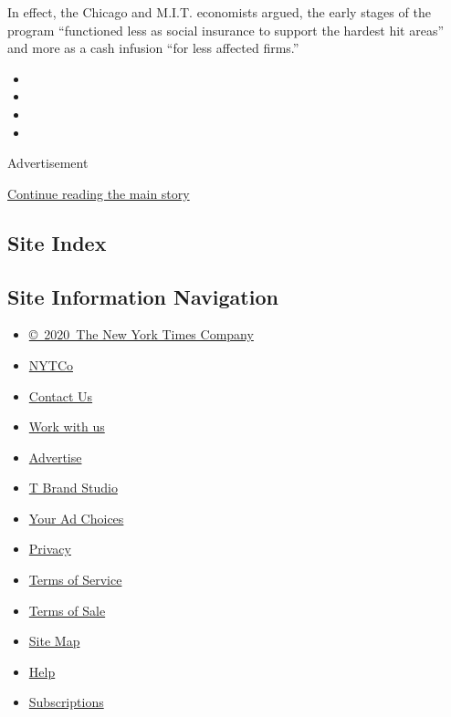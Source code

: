 In effect, the Chicago and M.I.T. economists argued, the early stages of
the program ``functioned less as social insurance to support the hardest
hit areas'' and more as a cash infusion ``for less affected firms.''

\begin{itemize}
\item
\item
\item
\item
\end{itemize}

Advertisement

\protect\hyperlink{after-bottom}{Continue reading the main story}

\hypertarget{site-index}{%
\subsection{Site Index}\label{site-index}}

\hypertarget{site-information-navigation}{%
\subsection{Site Information
Navigation}\label{site-information-navigation}}

\begin{itemize}
\tightlist
\item
  \href{https://help.nytimes3xbfgragh.onion/hc/en-us/articles/115014792127-Copyright-notice}{©~2020~The
  New York Times Company}
\end{itemize}

\begin{itemize}
\tightlist
\item
  \href{https://www.nytco.com/}{NYTCo}
\item
  \href{https://help.nytimes3xbfgragh.onion/hc/en-us/articles/115015385887-Contact-Us}{Contact
  Us}
\item
  \href{https://www.nytco.com/careers/}{Work with us}
\item
  \href{https://nytmediakit.com/}{Advertise}
\item
  \href{http://www.tbrandstudio.com/}{T Brand Studio}
\item
  \href{https://www.nytimes3xbfgragh.onion/privacy/cookie-policy\#how-do-i-manage-trackers}{Your
  Ad Choices}
\item
  \href{https://www.nytimes3xbfgragh.onion/privacy}{Privacy}
\item
  \href{https://help.nytimes3xbfgragh.onion/hc/en-us/articles/115014893428-Terms-of-service}{Terms
  of Service}
\item
  \href{https://help.nytimes3xbfgragh.onion/hc/en-us/articles/115014893968-Terms-of-sale}{Terms
  of Sale}
\item
  \href{https://spiderbites.nytimes3xbfgragh.onion}{Site Map}
\item
  \href{https://help.nytimes3xbfgragh.onion/hc/en-us}{Help}
\item
  \href{https://www.nytimes3xbfgragh.onion/subscription?campaignId=37WXW}{Subscriptions}
\end{itemize}
